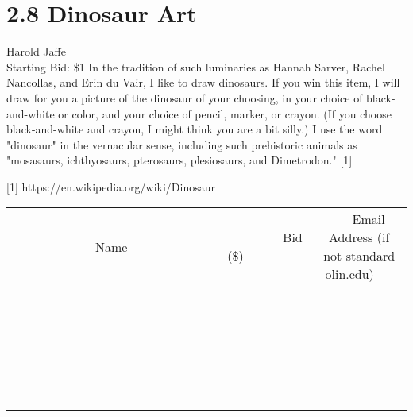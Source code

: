 \documentclass[11pt]{article}
\begin{document}
\section*{2.8 Dinosaur Art}
Harold Jaffe
\\
Starting Bid: \$1
\newline
In the tradition of such luminaries as Hannah Sarver, Rachel Nancollas, and Erin du Vair, I like to draw dinosaurs. If you win this item, I will draw for you a picture of the dinosaur of your choosing, in your choice of black-and-white or color, and your choice of pencil, marker, or crayon. (If you choose black-and-white and crayon, I might think you are a bit silly.) I use the word "dinosaur" in the vernacular sense, including such prehistoric animals as "mosasaurs, ichthyosaurs, pterosaurs, plesiosaurs, and Dimetrodon." [1]

[1] https://en.wikipedia.org/wiki/Dinosaur
\\[6ex]
\begin{tabular}{c c c}
~~~~~~~~~~~~~Name~~~~~~~~~~~~~ & ~~~~~~~~~Bid (\$)~~~~~~~~~  & ~~~Email Address (if not standard olin.edu)~~~\\
 & & \\
\hline
 & & \\
\hline
 & & \\
\hline
 & & \\
\hline
 & & \\
\hline
 & & \\
\hline
 & & \\
\hline
 & & \\
\hline
 & & \\
\hline
 & & \\
\hline
 & & \\
\hline
 & & \\
\hline
 & & \\
\hline
 & & \\
\hline
 & & \\
\hline
 & & \\
\hline
 & & \\
\hline
 & & \\
\hline
 & & \\
\hline
 & & \\
\hline
 & & \\
\hline
 & & \\
\hline
 & & \\
\hline
 & & \\
\hline
 & & \\
\hline
 & & \\
\hline
\end{tabular}
\newpage
\end{document}
